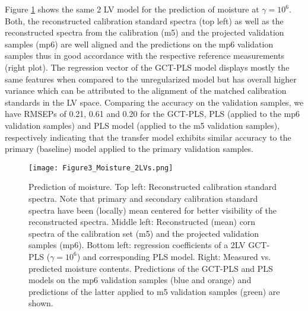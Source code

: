 \documentclass{article}
\begin{document}
Figure \ref{fig:figure4} shows the same 2 LV model for the prediction of moisture at $\gamma = 10^6$. Both, the reconstructed calibration standard spectra (top left) as well as the reconstructed spectra from the calibration (m5) and the projected validation samples (mp6) are well aligned and the predictions on the mp6 validation samples thus in good accordance with the respective reference measurements (right plot). The regression vector of the GCT-PLS model displays mostly the same features when compared to the unregularized model but has overall higher variance which can be attributed to the alignment of the matched calibration standards in the LV space. Comparing the accuracy on the validation samples, we have RMSEPs of 0.21, 0.61 and 0.20 for the GCT-PLS, PLS (applied to the mp6 validation samples) and PLS model (applied to the m5 validation samples), respectively indicating that the transfer model exhibits similar accuracy to the primary (baseline) model applied to the primary validation samples.

\begin{figure}[h!]
	\centering
	\texttt{[image: Figure3\_Moisture\_2LVs.png]}
	\caption{Prediction of moisture. Top left: Reconstructed calibration standard spectra. Note that primary and secondary calibration standard spectra have been (locally) mean centered for better visibility of the reconstructed spectra. Middle left: Reconstructed (mean) corn spectra of the calibration set (m5) and the projected validation samples (mp6). Bottom left: regression coefficients of a 2LV GCT-PLS ($\gamma = 10^6$) and corresponding PLS model. Right: Measured vs. predicted moisture contents. Predictions of the GCT-PLS and PLS models on the mp6 validation samples (blue and orange) and predictions of the latter applied to m5 validation samples (green) are shown.}
	\label{fig:figure4}
\end{figure}
\end{document}
